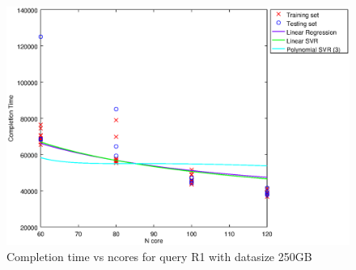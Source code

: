 
\begin {figure}[hbtp]
\centering
\includegraphics[width=\textwidth]{output/R1_250_1_OVER_NCORES/plot_R1_250_bestmodels.eps}
\caption{Completion time vs ncores for query R1 with datasize 250GB}
\label{fig:all_nonlinear_R1_250}
\end {figure}
